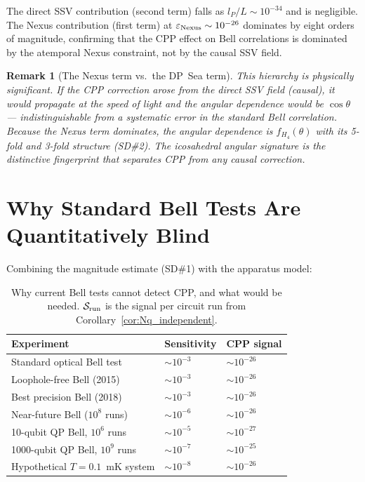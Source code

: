 \documentclass[11pt,a4paper]{article}
\newtheorem{remark}[theorem]{Remark}
\newcommand{\lP}{l_P}
\newcommand{\eps}{\varepsilon}
\begin{document}
The direct SSV contribution (second term) falls as $\lP/L \sim
10^{-34}$ and is negligible.  The Nexus contribution (first term)
at $\eps_{\rm Nexus} \sim 10^{-26}$ dominates by eight orders of
magnitude, confirming that the CPP effect on Bell correlations is
dominated by the atemporal Nexus constraint, not by the causal
SSV field.

\begin{remark}[The Nexus term vs.\ the DP~Sea term]
This hierarchy is physically significant.  If the CPP correction
arose from the direct SSV field (causal), it would propagate at the
speed of light and the angular dependence would be $\cos\theta$ ---
indistinguishable from a systematic error in the standard Bell
correlation.  Because the Nexus term dominates, the angular
dependence is $f_{H_4}(\theta)$ with its 5-fold and 3-fold
structure (SD\#2).  The icosahedral angular signature is the
distinctive fingerprint that separates CPP from any causal correction.
\end{remark}

\section{Why Standard Bell Tests Are Quantitatively Blind}
\label{sec:why_blind}

Combining the magnitude estimate (SD\#1) with the apparatus model:

\begin{table}[H]
\centering
\caption{Why current Bell tests cannot detect CPP, and what
  would be needed.  $\mathcal{S}_{\rm run}$ is the signal per
  circuit run from Corollary~\ref{cor:Nq_independent}.}
\label{tab:sensitivity}
\begin{tabular}{@{}p{4.5cm}p{3cm}p{4.5cm}@{}}
\toprule
Experiment & Sensitivity & CPP signal \\
\midrule
Standard optical Bell test & $\sim 10^{-3}$ & $\sim 10^{-26}$ \\
Loophole-free Bell (2015) & $\sim 10^{-3}$ & $\sim 10^{-26}$ \\
Best precision Bell (2018) & $\sim 10^{-3}$ & $\sim 10^{-26}$ \\
Near-future Bell ($10^8$ runs) & $\sim 10^{-6}$ & $\sim 10^{-26}$ \\
\midrule
10-qubit QP Bell, $10^6$ runs & $\sim 10^{-5}$ & $\sim 10^{-27}$ \\
1000-qubit QP Bell, $10^9$ runs & $\sim 10^{-7}$ & $\sim 10^{-25}$ \\
Hypothetical $T=0.1$~mK system & $\sim 10^{-8}$ & $\sim 10^{-26}$ \\
\bottomrule
\end{tabular}
\end{table}
\end{document}
